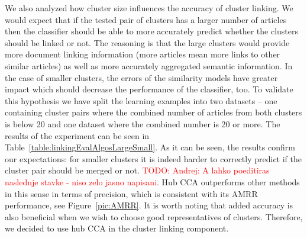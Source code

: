 \documentclass[twoside,11pt]{article}
\newcommand{\todo}[1]{\textcolor{red}{TODO: #1}}
\newcommand{\oldText}[1]{\textcolor{red}{#1:}\color{blue}}
\begin{document}
We also analyzed how cluster size influences the accuracy of cluster linking. We would expect that if the tested pair of clusters has a larger number of articles then the classifier should be able to more accurately predict whether the clusters should be linked or not. The reasoning is that the large clusters would provide more document linking information (more articles mean more links to other similar articles) as well as more accurately aggregated semantic information. In the case of smaller clusters, the errors of the similarity models have greater impact which should decrease the performance of the classifier, too. To validate this hypothesis we have split the learning examples into two datasets -- one containing cluster pairs where the combined number of articles from both clusters is below 20 and one dataset where the combined number is 20 or more. The results of the experiment can be seen in Table~\ref{table:linkingEvalAlgosLargeSmall}. As it can be seen, the results confirm our expectations: for smaller clusters it is indeed harder to correctly predict if the cluster pair should be merged or not. \todo{Andrej: A lahko poeditiras naslednje stavke - niso zelo jasno napisani.} Hub CCA outperforms other methods in this sense in terms of precision, which is consistent with its AMRR performance, see Figure~\ref{pic:AMRR}.
It is worth noting that added accuracy is also beneficial when we wish to choose good representatives of clusters. Therefore, we decided to use hub CCA in the cluster linking component.

\end{document}
